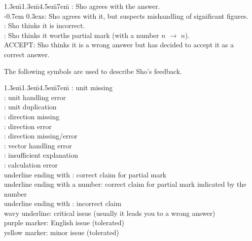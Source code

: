 \documentclass[11pt,pdfa,lastpage,minititle]{MishoNote}
\begin{document}
\begin{DownPara}
\begin{tabbing}
  \kern1.3em\=\kern1.3em\=\kern4.5em\=\kern7em\=\kill
  \>: Sho agrees with the answer.\\
  \kern-0.7em \raise0.3ex\hbox{\small\textsf s}\>: Sho agrees with it, but suspects mishandling of significant figures.\\
  \>: Sho thinks it is incorrect.\\
  \>: Sho thinks it worths partial mark (with a number $n$ $\to$ $n$).\\[.5em]
  \textsf{ACCEPT}: Sho thinks it is a wrong answer but has decided to accept it as a correct answer.
\end{tabbing}
\end{DownPara}

\noindent The following symbols are used to describe Sho's feedback.
\begin{DownPara}
\begin{tabbing}
  \kern1.3em\=\kern1.3em\=\kern4.5em\=\kern7em\=\kill
  \>\>: unit missing\\
  \>\>: unit handling error\\
  \>\>: unit duplication\\
  \>\>: direction missing\\
  \>\>: direction error\\
  \>\>: direction missing/error\\
  \>\>: vector handling error\\
  \>\>: insufficient explanation\\
  \>\>: calculation error\\[1em]

  underline ending with \>\>\>\>: correct claim for partial mark\\
  underline ending with a number\>\>\>\>: correct claim for partial mark indicated by the number\\
  underline ending with \>\>\>\>: incorrect claim\\[1em]

  wavy underline\>\>\>: critical issue (usually it leads you to a wrong answer)\\
  purple marker\>\>\>: English issue (tolerated)\\
  yellow marker\>\>\>: minor issue (tolerated)\\
\end{tabbing}
\end{DownPara}
\end{document}

